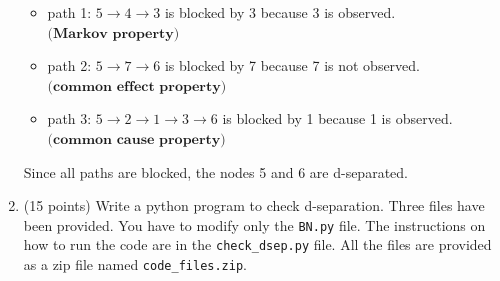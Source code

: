 \documentclass[a3paper,12pt]{extarticle} %
\begin{document}
\begin{enumerate}
\begin{figure}[h!]
        \label{fig:example_image}
    \end{figure} 
    \begin{itemize}
        \item path 1: \(5 \rightarrow 4 \rightarrow 3\) is blocked by 3 because 3 is observed. \(\textbf{(Markov property)}\)
        \item path 2: \(5 \rightarrow 7 \rightarrow 6\) is blocked by 7 because 7 is not observed. \(\textbf{(common effect property)}\)
        \item path 3: \(5 \rightarrow 2 \rightarrow 1 \rightarrow 3 \rightarrow 6\) is blocked by 1 because 1 is observed. \(\textbf{(common cause property)}\)
    \end{itemize}
    Since all paths are blocked, the nodes 5 and 6 are d-separated.
    \item (15 points) Write a python program to check d-separation. Three files have been provided. You have to modify only the \texttt{BN.py} file. The instructions on how to run the code are in the \texttt{check\_dsep.py} file. All the files are provided as a zip file named \texttt{code\_files.zip}.
\end{enumerate}
\end{document}
